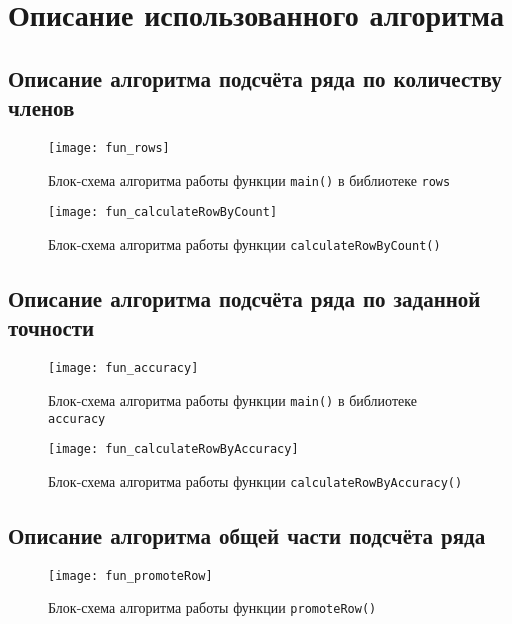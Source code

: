 \section{Описание использованного алгоритма}

\subsection{Описание алгоритма подсчёта ряда по количеству членов}

\begin{figure}[H]
  \centering
  \texttt{[image: fun\_rows]}
  \caption{Блок-схема алгоритма работы функции \texttt{main()} в библиотеке \texttt{rows}}
\end{figure}

\begin{figure}[H]
  \centering
  \texttt{[image: fun\_calculateRowByCount]}
  \caption{Блок-схема алгоритма работы функции \texttt{calculateRowByCount()}}
\end{figure}

\subsection{Описание алгоритма подсчёта ряда по заданной точности}

\begin{figure}[H]
  \centering
  \texttt{[image: fun\_accuracy]}
  \caption{Блок-схема алгоритма работы функции \texttt{main()} в библиотеке \texttt{accuracy}}
\end{figure}

\begin{figure}[H]
  \centering
  \texttt{[image: fun\_calculateRowByAccuracy]}
  \caption{Блок-схема алгоритма работы функции \texttt{calculateRowByAccuracy()}}
\end{figure}

\subsection{Описание алгоритма общей части подсчёта ряда}

\begin{figure}[H]
  \centering
  \texttt{[image: fun\_promoteRow]}
  \caption{Блок-схема алгоритма работы функции \texttt{promoteRow()}}
\end{figure}
